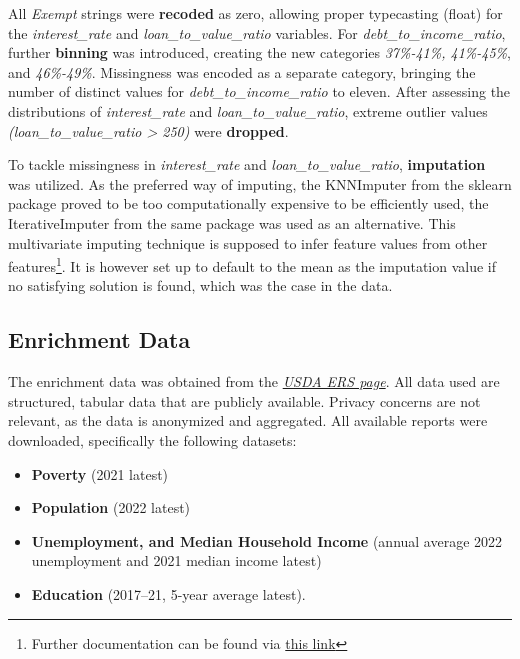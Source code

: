 All \textit{Exempt} strings were \textbf{recoded} as zero, allowing proper typecasting (float) for the \textit{interest\_rate} and \textit{loan\_to\_value\_ratio} variables. 
For \textit{debt\_to\_income\_ratio}, further \textbf{binning} was introduced, creating the new categories \textit{37\%-41\%, 41\%-45\%}, and \textit{46\%-49\%}. Missingness was encoded as a separate category, bringing the number of distinct values for \textit{debt\_to\_income\_ratio} to eleven. 
After assessing the distributions of \textit{interest\_rate} and \textit{loan\_to\_value\_ratio}, extreme outlier values \textit{(loan\_to\_value\_ratio > 250)} were \textbf{dropped}. 

To tackle missingness in \textit{interest\_rate} and \textit{loan\_to\_value\_ratio}, \textbf{imputation} was utilized. 
As the preferred way of imputing, the KNNImputer from the sklearn package proved to be too computationally expensive to be efficiently used, the IterativeImputer from the same package was used as an alternative. 
This multivariate imputing technique is supposed to infer feature values from other features\footnote{Further documentation can be found via \href{https://scikit-learn.org/stable/modules/generated/sklearn.impute.IterativeImputer.html}{this link}}. It is however set up to default to the mean as the imputation value if no satisfying solution is found, which was the case in the data.

\subsection{Enrichment Data}\label{subsec:Enrichment_Data}

The enrichment data was obtained from the \textit{\href{https://www.ers.usda.gov/data-products/county-level-data-sets/}{USDA ERS page}}. All data used are structured, tabular data that are publicly available. Privacy concerns are not relevant, as the data is anonymized and aggregated. All available reports were downloaded, specifically the following datasets:

\begin{itemize}
    \item \textbf{Poverty} (2021 latest)
    \item \textbf{Population} (2022 latest)
    \item \textbf{Unemployment, and Median Household Income} (annual average 2022 unemployment and 2021 median income latest)
    \item \textbf{Education} (2017–21, 5-year average latest).
\end{itemize}

